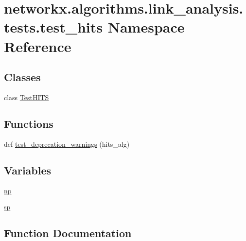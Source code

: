\hypertarget{namespacenetworkx_1_1algorithms_1_1link__analysis_1_1tests_1_1test__hits}{}\section{networkx.\+algorithms.\+link\+\_\+analysis.\+tests.\+test\+\_\+hits Namespace Reference}
\label{namespacenetworkx_1_1algorithms_1_1link__analysis_1_1tests_1_1test__hits}
\subsection*{Classes}
\begin{DoxyCompactItemize}
\item 
class \hyperlink{classnetworkx_1_1algorithms_1_1link__analysis_1_1tests_1_1test__hits_1_1TestHITS}{Test\+H\+I\+TS}
\end{DoxyCompactItemize}
\subsection*{Functions}
\begin{DoxyCompactItemize}
\item 
def \hyperlink{namespacenetworkx_1_1algorithms_1_1link__analysis_1_1tests_1_1test__hits_a2c6eb8174b5e89a18c2bade2eaa034dd}{test\+\_\+deprecation\+\_\+warnings} (hits\+\_\+alg)
\end{DoxyCompactItemize}
\subsection*{Variables}
\begin{DoxyCompactItemize}
\item 
\hyperlink{namespacenetworkx_1_1algorithms_1_1link__analysis_1_1tests_1_1test__hits_a15875bae53f3a6d9235e92aa3a953f67}{np}
\item 
\hyperlink{namespacenetworkx_1_1algorithms_1_1link__analysis_1_1tests_1_1test__hits_ad9675ca7a08f9253499b8e5fe542605d}{sp}
\end{DoxyCompactItemize}


\subsection{Function Documentation}
\mbox{\label{namespacenetworkx_1_1algorithms_1_1link__analysis_1_1tests_1_1test__hits_a2c6eb8174b5e89a18c2bade2eaa034dd}} 
